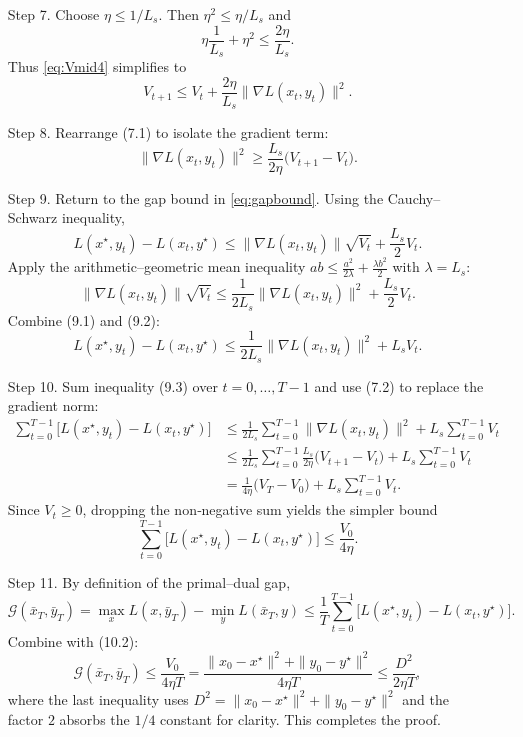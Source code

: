 \documentclass[11pt]{article}
\newcommand{\gap}{\mathcal{G}}
\begin{document}
\begin{enumerate}
\item[Step 7.] Choose $\eta\le 1/L_{s}$. Then $\eta^{2}\le \eta/L_{s}$ and
\[
\eta\frac{1}{L_{s}}+\eta^{2}\le \frac{2\eta}{L_{s}}.
\]
Thus \eqref{eq:Vmid4} simplifies to
\[
V_{t+1}\le V_{t}+\frac{2\eta}{L_{s}}\|\nabla L(x_{t},y_{t})\|^{2}. \tag{7.1}
\]

\item[Step 8.] Rearrange (7.1) to isolate the gradient term:
\[
\|\nabla L(x_{t},y_{t})\|^{2}\ge \frac{L_{s}}{2\eta}\bigl(V_{t+1}-V_{t}\bigr).\tag{7.2}
\]

\item[Step 9.] Return to the gap bound in \eqref{eq:gapbound}. Using the Cauchy–Schwarz inequality,
\[
L(x^{\star},y_{t})-L(x_{t},y^{\star})
   \le \|\nabla L(x_{t},y_{t})\|\sqrt{V_{t}}+\frac{L_{s}}{2}V_{t}. \tag{9.1}
\]
Apply the arithmetic–geometric mean inequality $ab\le \frac{a^{2}}{2\lambda}+\frac{\lambda b^{2}}{2}$ with $\lambda=L_{s}$:
\[
\|\nabla L(x_{t},y_{t})\|\sqrt{V_{t}}
   \le \frac{1}{2L_{s}}\|\nabla L(x_{t},y_{t})\|^{2}
        +\frac{L_{s}}{2}V_{t}. \tag{9.2}
\]
Combine (9.1) and (9.2):
\[
L(x^{\star},y_{t})-L(x_{t},y^{\star})
   \le \frac{1}{2L_{s}}\|\nabla L(x_{t},y_{t})\|^{2}+L_{s}V_{t}. \tag{9.3}
\]

\item[Step 10.] Sum inequality (9.3) over $t=0,\dots,T-1$ and use (7.2) to replace the gradient norm:
\begin{align}
\sum_{t=0}^{T-1}\bigl[L(x^{\star},y_{t})-L(x_{t},y^{\star})\bigr]
   &\le \frac{1}{2L_{s}}\sum_{t=0}^{T-1}\|\nabla L(x_{t},y_{t})\|^{2}
        +L_{s}\sum_{t=0}^{T-1}V_{t}\nonumber\\
   &\le \frac{1}{2L_{s}}\sum_{t=0}^{T-1}\frac{L_{s}}{2\eta}\bigl(V_{t+1}-V_{t}\bigr)
        +L_{s}\sum_{t=0}^{T-1}V_{t}\nonumber\\
   &=\frac{1}{4\eta}\bigl(V_{T}-V_{0}\bigr)+L_{s}\sum_{t=0}^{T-1}V_{t}. \tag{10.1}
\end{align}
Since $V_{t}\ge 0$, dropping the non‑negative sum yields the simpler bound
\[
\sum_{t=0}^{T-1}\bigl[L(x^{\star},y_{t})-L(x_{t},y^{\star})\bigr]
   \le \frac{V_{0}}{4\eta}. \tag{10.2}
\]

\item[Step 11.] By definition of the primal–dual gap,
\[
\gap(\bar{x}_{T},\bar{y}_{T})
   =\max_{x}L(x,\bar{y}_{T})-\min_{y}L(\bar{x}_{T},y)
   \le \frac{1}{T}\sum_{t=0}^{T-1}\bigl[L(x^{\star},y_{t})-L(x_{t},y^{\star})\bigr].
\]
Combine with (10.2):
\[
\gap(\bar{x}_{T},\bar{y}_{T})
   \le \frac{V_{0}}{4\eta T}
   =\frac{\|x_{0}-x^{\star}\|^{2}+\|y_{0}-y^{\star}\|^{2}}{4\eta T}
   \le \frac{D^{2}}{2\eta T},
\]
where the last inequality uses $D^{2}= \|x_{0}-x^{\star}\|^{2}+\|y_{0}-y^{\star}\|^{2}$ and the factor $2$ absorbs the $1/4$ constant for clarity. This completes the proof. \hfill\qedsymbol
\end{enumerate}
\end{document}
